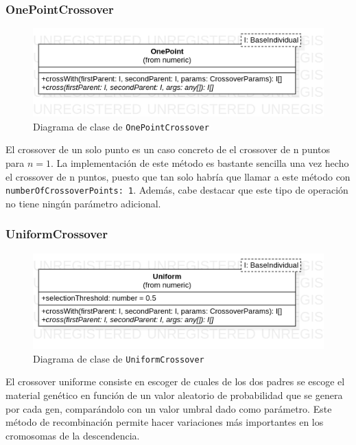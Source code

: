 \subsubsection{OnePointCrossover}

\begin{figure}[ht]
    \centering
    \includegraphics[scale=0.5]{mem/images/cap-4/4.2.6(Crossover)/OnePoint.png}
    \caption{Diagrama de clase de \texttt{OnePointCrossover}}
    \label{fig:my_label}
\end{figure}

El crossover de un solo punto es un caso concreto de el crossover de n puntos para $n = 1$. La implementación de este método es bastante sencilla una vez hecho el crossover de n puntos, puesto que tan solo habría que llamar a este método con \texttt{numberOfCrossoverPoints: 1}. Además, cabe destacar que este tipo de operación no tiene ningún parámetro adicional.

\subsubsection{UniformCrossover}

\begin{figure}[ht]
    \centering
    \includegraphics[scale=0.5]{mem/images/cap-4/4.2.6(Crossover)/Uniform.png}
    \caption{Diagrama de clase de \texttt{UniformCrossover}}
    \label{fig:my_label}
\end{figure}

El crossover uniforme consiste en escoger de cuales de los dos padres se escoge el material genético en función de un valor aleatorio de probabilidad que se genera por cada gen, comparándolo con un valor umbral dado como parámetro. Este método de recombinación permite hacer variaciones más importantes en los cromosomas de la descendencia. \\

